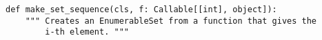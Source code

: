 \begin{verbatim}
def make_set_sequence(cls, f: Callable[[int], object]):
    """ Creates an EnumerableSet from a function that gives the
        i-th element. """
\end{verbatim}